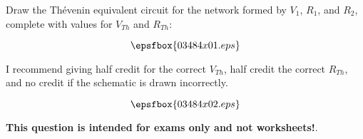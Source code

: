 

Draw the Th\'evenin equivalent circuit for the network formed by $V_1$, $R_1$, and $R_2$, complete with values for $V_{Th}$ and $R_{Th}$:

$$\epsfbox{03484x01.eps}$$

\vskip 40pt







I recommend giving half credit for the correct $V_{Th}$, half credit the correct $R_{Th}$, and no credit if the schematic is drawn incorrectly.

$$\epsfbox{03484x02.eps}$$







{\bf This question is intended for exams only and not worksheets!}.



